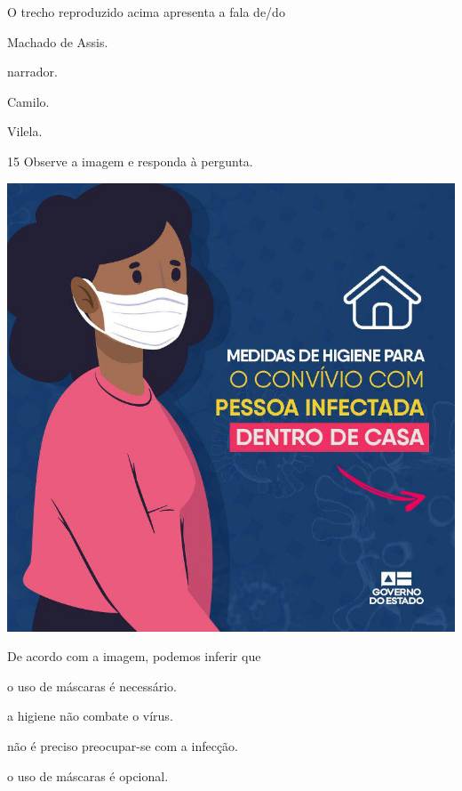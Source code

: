 O trecho reproduzido acima apresenta a fala de/do

\begin{multicols}{2}
\begin{escolha}
  \item Machado de Assis.

  \item narrador.

  \item Camilo.

  \item Vilela.
\end{escolha}
\end{multicols}

\num{15} Observe a imagem e responda à pergunta.

\begin{center}
\includegraphics[width=.8\textwidth]{./imgQ4PORT/media/image5.jpeg}
\end{center}



De acordo com a imagem, podemos inferir que

\begin{escolha}
  \item o uso de máscaras é necessário.

  \item a higiene não combate o vírus.

  \item não é preciso preocupar-se com a infecção.

  \item o uso de máscaras é opcional.
\end{escolha}
\pagebreak

